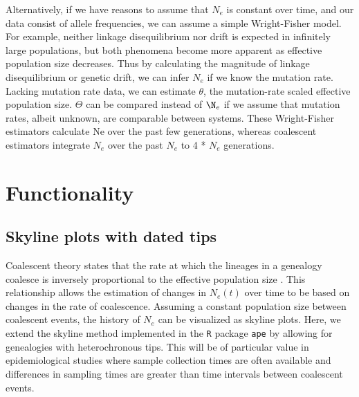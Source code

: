\documentclass[english,titlepage]{article}
\begin{document}
Alternatively, if we have reasons to assume that $N_{e}$ is constant over time, and our data consist of allele frequencies, we can assume a simple Wright-Fisher model. For example, neither linkage disequilibrium nor drift is expected in infinitely large populations, but both phenomena become more apparent as effective population size decreases. Thus by calculating the magnitude of linkage disequilibrium or genetic drift, we can infer $N_{e}$ if we know the mutation rate. Lacking mutation rate data, we can estimate $\theta$,  the mutation-rate scaled effective population size. $\Theta$ can be compared instead of $\N_{e}$ if we assume that mutation rates, albeit unknown, are comparable between systems. These Wright-Fisher estimators calculate Ne over the past few generations, whereas coalescent estimators integrate $N_e$ over the past $N_e$ to 4 * $N_e$ generations.



\section*{Functionality}
\subsection*{Skyline plots with dated tips}

Coalescent theory states that the rate at which the lineages in a genealogy coalesce is inversely proportional to the effective population size \citep{Kingman1982} \citep{slatkin_pairwise_1991}. This relationship allows the estimation of changes in $N_e(t)$ over time to be based on changes in the rate of coalescence. Assuming a constant population size between coalescent events, the history of $N_e$ can be visualized as skyline plots. Here, we extend the skyline method implemented in the \texttt{R} package \texttt{ape} \citep{Paradis2004} by allowing for genealogies with heterochronous tips. This will be of particular value in epidemiological studies where sample collection times are often available and differences in sampling times are greater than time intervals between coalescent events. 
\end{document}
